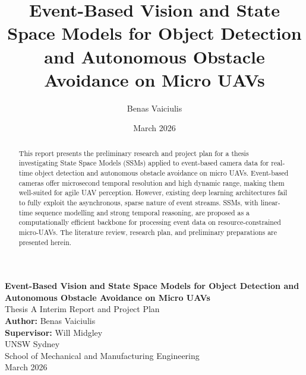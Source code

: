 \documentclass[11pt, a4paper]{report}
\title{Event-Based Vision and State Space Models for Object Detection and Autonomous Obstacle Avoidance on Micro UAVs}
\author{Benas Vaiciulis}
\date{March 2026}
\begin{document}
\begin{titlepage}
    \centering
    \vspace*{1cm}
    \Large\textbf{Event-Based Vision and State Space Models for Object Detection and Autonomous Obstacle Avoidance on Micro UAVs} \\
    \vspace{0.5cm}
    \large Thesis A Interim Report and Project Plan \\
    \vspace{1.5cm}
    \textbf{Author:} Benas Vaiciulis \\
    \textbf{Supervisor:} Will Midgley\\
    \vspace{1.5cm}
    UNSW Sydney \\
    School of Mechanical and Manufacturing Engineering \\
    \vfill
    March 2026
\end{titlepage}

\begin{abstract}
This report presents the preliminary research and project plan for a thesis investigating State Space Models (SSMs) applied to event-based camera data for real-time object detection and autonomous obstacle avoidance on micro UAVs. Event-based cameras offer microsecond temporal resolution and high dynamic range, making them well-suited for agile UAV perception. However, existing deep learning architectures fail to fully exploit the asynchronous, sparse nature of event streams. SSMs, with linear-time sequence modelling and strong temporal reasoning, are proposed as a computationally efficient backbone for processing event data on resource-constrained micro-UAVs. The literature review, research plan, and preliminary preparations are presented herein.
\end{abstract}

\tableofcontents

\end{document}
